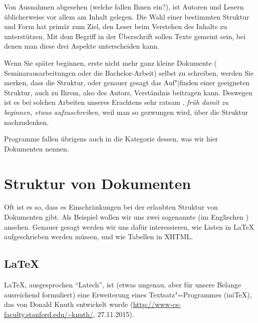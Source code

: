 Von Ausnahmen abgesehen (welche fallen Ihnen ein?), ist Autoren und Lesern
üblicherweise vor allem am Inhalt gelegen. Die Wahl einer bestimmten Struktur
und Form hat primär zum Ziel, den Leser beim Verstehen des Inhalts zu
unterstützen. Mit dem Begriff  in der
Überschrift sollen Texte gemeint sein, bei denen man diese drei Aspekte
unterscheiden kann.

Wenn Sie später beginnen, erste nicht mehr ganz kleine Dokumente (\zB
Seminarausarbeitungen oder die Bachelor-Arbeit) selbst zu schreiben, werden
Sie merken, dass die Struktur, oder genauer gesagt das Auf"|finden einer
geeigneten Struktur, auch zu Ihrem, also des Autors, Verständnis beitragen
kann. Deswegen ist es bei solchen Arbeiten unseres Erachtens sehr ratsam%
,
\emph{früh damit zu beginnen, etwas aufzuschreiben,} weil man so gezwungen
wird, über die Struktur nachzudenken.

Programme fallen übrigens auch in die Kategorie dessen, was wir hier
Dokumenten nennen.

\section{Struktur von Dokumenten}

Oft ist es so, dass es Einschränkungen bei der erlaubten Struktur von
Dokumenten gibt. Als Beispiel wollen wir uns zwei sogenannte
%
 (im Englischen ) ansehen. Genauer gesagt werden wir uns dafür
interessieren, wie Listen in \LaTeX{} aufgeschrieben werden müssen, und wie
Tabellen in XHTML.

\subsection{\LaTeX}

\LaTeX{}, ausgesprochen "`Latech"', ist (etwas ungenau,
aber für unsere Belange ausreichend formuliert) eine Erweiterung eines
Textsatz"=Programmes (ini\TeX), das von Donald Knuth
entwickelt wurde (\url{http://www-cs-faculty.stanford.edu/~knuth/}, 27.11.2015).

